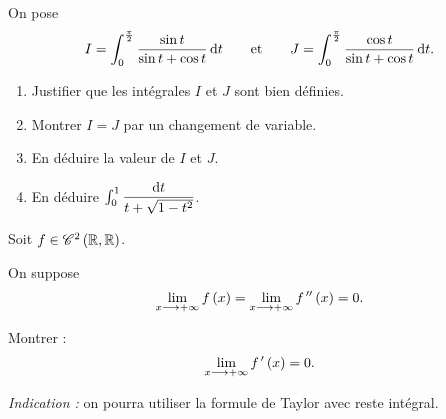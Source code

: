 \begin{corr}
\end{corr}

\begin{exo}[Exercice 5]
On pose \[I=\int_0^{\frac{\pi}{2}}\dfrac{\sin t}{\sin t+\cos t}\odif{t}\qquad\text{et}\qquad J=\int_0^{\frac{\pi}{2}}\dfrac{\cos t}{\sin t+\cos t}\odif{t}.\]

\begin{enumerate}
\item Justifier que les intégrales \(I\) et \(J\) sont bien définies. \\

\item Montrer \(I=J\) par un changement de variable. \\

\item En déduire la valeur de \(I\) et \(J\). \\

\item En déduire \(\int_0^1\dfrac{\odif{t}}{t+\sqrt{1-t^2}}\).
\end{enumerate}
\end{exo}

\begin{corr}
\end{corr}

\begin{exo}[Exercice 6]
Soit \(f\in\mathscr{C}^{2}\left(\mathbb{R},\mathbb{R}\right)\).

On suppose \[\lim_{x\longrightarrow+\infty}f\left(x\right)=\lim_{x\longrightarrow+\infty}f^{\,\prime\prime}\left(x\right)=0.\]

Montrer : \[\lim_{x\longrightarrow+\infty}f^{\,\prime}\left(x\right)=0.\]

\textit{Indication :} on pourra utiliser la formule de Taylor avec reste intégral.
\end{exo}

\begin{corr}
\end{corr}

